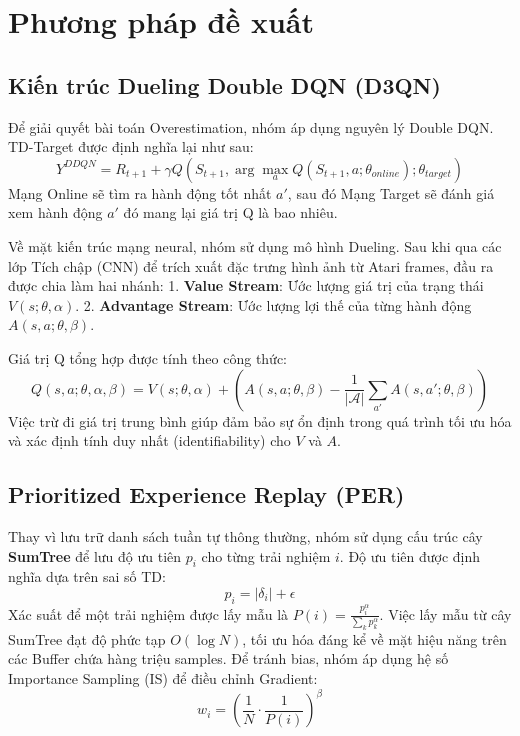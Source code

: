 \section{Phương pháp đề xuất}

\subsection{Kiến trúc Dueling Double DQN (D3QN)}
Để giải quyết bài toán Overestimation, nhóm áp dụng nguyên lý Double DQN. TD-Target được định nghĩa lại như sau:
\begin{equation}
    Y^{DDQN} = R_{t+1} + \gamma Q(S_{t+1}, \arg\max_{a} Q(S_{t+1}, a; \theta_{online}); \theta_{target})
\end{equation}
Mạng Online sẽ tìm ra hành động tốt nhất $a'$, sau đó Mạng Target sẽ đánh giá xem hành động $a'$ đó mang lại giá trị Q là bao nhiêu.

Về mặt kiến trúc mạng neural, nhóm sử dụng mô hình Dueling. Sau khi qua các lớp Tích chập (CNN) để trích xuất đặc trưng hình ảnh từ Atari frames, đầu ra được chia làm hai nhánh:
1. \textbf{Value Stream}: Ước lượng giá trị của trạng thái $V(s; \theta, \alpha)$.
2. \textbf{Advantage Stream}: Ước lượng lợi thế của từng hành động $A(s, a; \theta, \beta)$.

Giá trị Q tổng hợp được tính theo công thức:
\begin{equation}
    Q(s, a; \theta, \alpha, \beta) = V(s; \theta, \alpha) + \left( A(s, a; \theta, \beta) - \frac{1}{|\mathcal{A}|} \sum_{a'} A(s, a'; \theta, \beta) \right)
\end{equation}
Việc trừ đi giá trị trung bình giúp đảm bảo sự ổn định trong quá trình tối ưu hóa và xác định tính duy nhất (identifiability) cho $V$ và $A$.

\subsection{Prioritized Experience Replay (PER)}
Thay vì lưu trữ danh sách tuần tự thông thường, nhóm sử dụng cấu trúc cây \textbf{SumTree} để lưu độ ưu tiên $p_i$ cho từng trải nghiệm $i$. Độ ưu tiên được định nghĩa dựa trên sai số TD:
\begin{equation}
    p_i = |\delta_i| + \epsilon
\end{equation}
Xác suất để một trải nghiệm được lấy mẫu là $P(i) = \frac{p_i^\alpha}{\sum_k p_k^\alpha}$. Việc lấy mẫu từ cây SumTree đạt độ phức tạp $O(\log N)$, tối ưu hóa đáng kể về mặt hiệu năng trên các Buffer chứa hàng triệu samples.
Để tránh bias, nhóm áp dụng hệ số Importance Sampling (IS) để điều chỉnh Gradient:
\begin{equation}
    w_i = \left( \frac{1}{N} \cdot \frac{1}{P(i)} \right)^\beta
\end{equation}

